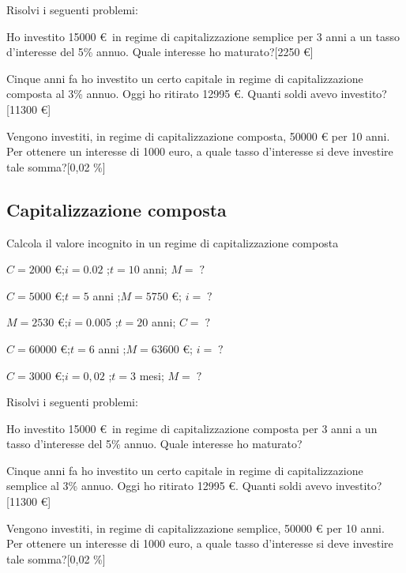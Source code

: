 \begin{esercizio}
Risolvi i seguenti problemi:
 \begin{enumeratea}
  \item Ho investito 15000 \euro\, in regime di capitalizzazione semplice 
per 3 anni a un tasso d'interesse del 5\% annuo. Quale interesse ho 
maturato?\hfill [2250 \euro]
  \item Cinque anni fa ho investito un certo capitale in regime di 
capitalizzazione composta al 3\% annuo. Oggi ho ritirato 12995 \euro. 
Quanti soldi avevo investito?\hfill [11300 \euro]
  \item Vengono investiti, in regime di capitalizzazione composta, 50000 
\euro\; per 10 anni. Per ottenere un interesse di 1000 euro, a quale tasso 
d'interesse si deve investire tale somma?\hfill [0,02 \%]
 \end{enumeratea}
\end{esercizio}

\subsection{Capitalizzazione composta}
\begin{esercizio}
Calcola il valore incognito in un regime di capitalizzazione composta
 \begin{enumeratea}
 \item \(C = 2000\) \euro ;\quad \(i = 0.02\) ;\quad \(t = 10\) anni;
       \quad \(M=\;?\)
 \item \(C = 5000\) \euro ;\quad \(t = 5\) anni ;\quad \(M = 5750\) \euro;
       \quad \(i=\;?\) 
 \item \(M = 2530\) \euro ;\quad \(i = 0.005\) ;\quad \(t = 20\) anni;
       \quad \(C=\;?\) \hfill
 \item \(C = 60000\) \euro ;\quad \(t = 6\) anni ;\quad \(M = 63600\) \euro;
       \quad \(i=\;?\) \hfill
 \item \(C = 3000\) \euro ;\quad \(i = 0,02\) ;\quad \(t = 3\) mesi;
       \quad \(M=\;?\) 
\hfill
 \end{enumeratea}
\end{esercizio}


\begin{esercizio}
Risolvi i seguenti problemi:
 \begin{enumeratea}
  \item Ho investito 15000 \euro\, in regime di capitalizzazione composta 
per 3 anni a un tasso d'interesse del 5\% annuo. Quale interesse ho 
maturato?\hfill
  \item Cinque anni fa ho investito un certo capitale in regime di 
capitalizzazione semplice al 3\% annuo. Oggi ho ritirato 12995 \euro. 
Quanti soldi avevo investito?\hfill [11300 \euro]
  \item Vengono investiti, in regime di capitalizzazione semplice, 50000 
\euro\; per 10 anni. Per ottenere un interesse di 1000 euro, a quale tasso 
d'interesse si deve investire tale somma?\hfill [0,02 \%]
 \end{enumeratea}
\end{esercizio}


